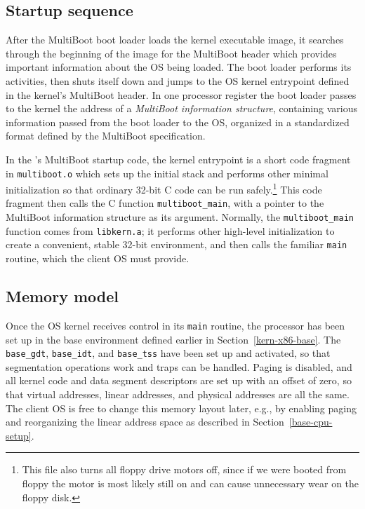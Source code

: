 \subsection{Startup sequence}

After the MultiBoot boot loader loads the kernel executable image,
it searches through the beginning of the image for the MultiBoot header
which provides important information about the OS being loaded.
The boot loader performs its activities,
then shuts itself down and jumps to the OS kernel entrypoint
defined in the kernel's MultiBoot header.
In one processor register the boot loader passes to the kernel
the address of a \emph{MultiBoot information structure},
containing various information passed from the boot loader to the OS,
organized in a standardized format defined by the MultiBoot specification.

In the \oskit{}'s MultiBoot startup code,
the kernel entrypoint is a short code fragment in {\tt multiboot.o}
which sets up the initial stack and performs other minimal initialization
so that ordinary 32-bit C code can be run safely.\footnote{%
        This file also turns all floppy drive motors off,
        since if we were booted from floppy the motor is
        most likely still on and can cause unnecessary wear on the
        floppy disk.}
This code fragment then calls the C function {\tt multiboot_main},
with a pointer to the MultiBoot information structure as its argument.
Normally, the {\tt multiboot_main} function comes from {\tt libkern.a};
it performs other high-level initialization
to create a convenient, stable 32-bit environment,
and then calls the familiar {\tt main} routine,
which the client OS must provide.

\subsection{Memory model}
\label{multiboot-memory-model}

Once the OS kernel receives control in its {\tt main} routine,
the processor has been set up in the base environment
defined earlier in Section~\ref{kern-x86-base}.
The {\tt base_gdt}, {\tt base_idt}, and {\tt base_tss}
have been set up and activated,
so that segmentation operations work and traps can be handled.
Paging is disabled,
and all kernel code and data segment descriptors
are set up with an offset of zero,
so that virtual addresses, linear addresses, and physical addresses
are all the same.
The client OS is free to change this memory layout later,
e.g., by enabling paging and reorganizing the linear address space
as described in Section~\ref{base-cpu-setup}.

